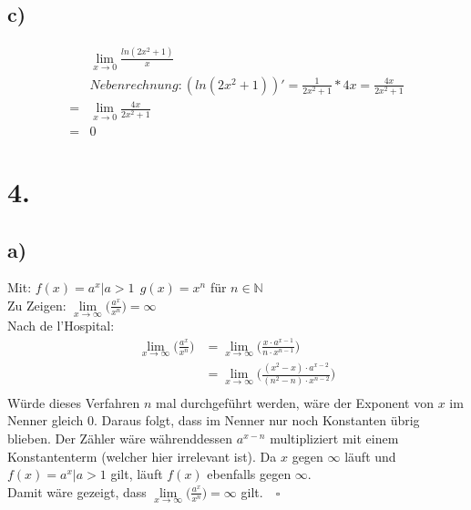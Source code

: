 \documentclass[a4paper]{scrartcl}
\newcommand{\qed}{\quad \square}
\begin{document}
\subsection{c)}
\begin{align}
&\lim_{x\to 0} \frac {ln(2x^2 + 1)} {x} \\
&Nebenrechnung: (ln(2x^2 + 1))' = \frac{1}{2x^2 + 1} * 4x = \frac{4x}{2x^2 +1} \\
= &\lim_{x\to 0} \frac{4x} {2x^2 + 1} \\
= &0
\end{align}
\newpage
\section{4.}
\subsection{a)}
Mit: \(f(x)=a^x |a>1\ \ g(x)=x^n\) für \(n\in \mathbb{N}\)\\
Zu Zeigen: \(\lim\limits_{x\to\infty}\bigg(\frac{a^x}{x^n}\bigg)=\infty\)\\
Nach de l'Hospital:
\begin{align}
\lim\limits_{x\to\infty}\bigg(\frac{a^x}{x^n}\bigg)&=\lim\limits_{x\to\infty}\bigg(\frac{x\cdot a^{x-1}}{n\cdot x^{n-1}}\bigg)\\
	&=\lim\limits_{x\to\infty}\bigg(\frac{(x^2-x)\cdot a^{x-2}}{(n^2-n)\cdot x^{n-2}}\bigg)\\
\end{align}
Würde dieses Verfahren \(n\) mal durchgeführt werden, wäre der Exponent von \(x\) im Nenner gleich 0. Daraus folgt, dass im Nenner nur noch Konstanten übrig blieben. Der Zähler wäre währenddessen \(a^{x-n}\) multipliziert mit einem Konstantenterm (welcher hier irrelevant ist). Da \(x\) gegen  \(\infty\) läuft und \(f(x)=a^x|a>1\) gilt, läuft \(f(x)\) ebenfalls gegen \(\infty\).\\
Damit wäre gezeigt, dass \(\lim\limits_{x\to\infty}\bigg(\frac{a^x}{x^n}\bigg)=\infty\) gilt.\(\qed\)
\end{document}
